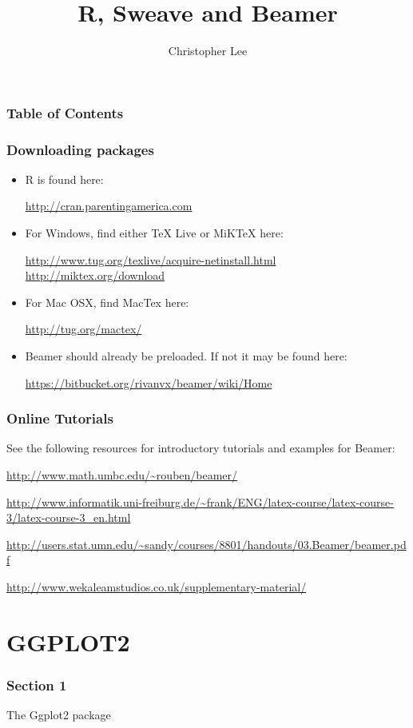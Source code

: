 \documentclass[nogin]{beamer}\usepackage[]{graphicx}\usepackage[]{color}
\title{R, Sweave and Beamer}
\author{Christopher Lee}
\begin{document}
\frame{\titlepage}

\begin{frame}
\frametitle{Table of Contents}
\tableofcontents
\end{frame}

\begin{frame}[fragile]
\frametitle{Downloading packages}
\footnotesize
\begin{itemize}
\item R is found here:\\
\begin{sloppypar}
\url{http://cran.parentingamerica.com}
\end{sloppypar}
\item For Windows, find either TeX Live or MiKTeX here:
\begin{sloppypar}
\url{http://www.tug.org/texlive/acquire-netinstall.html}
\url{http://miktex.org/download}
\end{sloppypar}
\item For Mac OSX, find  MacTex here:
\begin{sloppypar}
\url{http://tug.org/mactex/}
\end{sloppypar}
\item Beamer should already be preloaded. If not it may be found here:
\begin{sloppypar}
\url{https://bitbucket.org/rivanvx/beamer/wiki/Home}
\end{sloppypar}
\end{itemize}
\end{frame}

\begin{frame}
\frametitle{Online Tutorials}
See the following resources for introductory tutorials and examples for Beamer:
\begin{itemize}
\begin{sloppypar}
\item \url{http://www.math.umbc.edu/~rouben/beamer/}
\item \url{http://www.informatik.uni-freiburg.de/~frank/ENG/latex-course/latex-course-3/latex-course-3_en.html}
\item \url{http://users.stat.umn.edu/~sandy/courses/8801/handouts/03.Beamer/beamer.pdf}
\item \url{http://www.wekaleamstudios.co.uk/supplementary-material/}
\end{sloppypar}
\end{itemize}
\end{frame}

\section{GGPLOT2}
\begin{frame}
\frametitle{Section 1}
\begin{center}
\Large
The Ggplot2 package
\end{center}
\end{frame}
\end{document}
